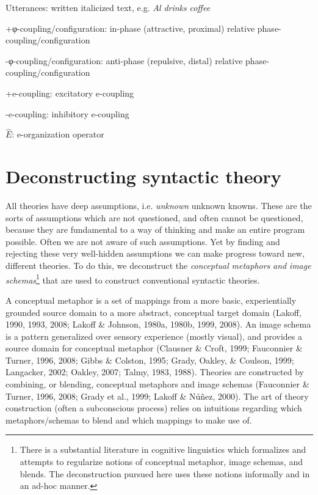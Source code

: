 Utterances: written italicized text, e.g. \textit{Al} \textit{drinks} \textit{coffee}

+φ-coupling/configuration: in-phase (attractive, proximal) relative phase-coupling/configuration

{}-φ-coupling/configuration: anti-phase (repulsive, distal) relative phase-coupling/configuration

+e-coupling: excitatory e-coupling

{}-e-coupling: inhibitory e-coupling

 $\widehat {{E}}$: e-organization operator

\chapter{Deconstructing syntactic theory}

All theories have deep assumptions, i.e. \textit{unknown} unknown knowns. These are the sorts of assumptions which are not questioned, and often cannot be questioned, because they are fundamental to a way of thinking and make an entire program possible. Often we are not aware of such assumptions. Yet by finding and rejecting these very well-hidden assumptions we can make progress toward new, different theories. To do this, we deconstruct the \textit{conceptual} \textit{metaphors} \textit{and} \textit{image} \textit{schemas}\footnote{There is a substantial literature in cognitive linguistics which formalizes and attempts to regularize notions of conceptual metaphor, image schemas, and blends. The deconstruction pursued here uses these notions informally and in an ad-hoc manner.} that are used to construct conventional syntactic theories. 

  A conceptual metaphor is a set of mappings from a more basic, experientially grounded source domain to a more abstract, conceptual target domain (Lakoff, 1990, 1993, 2008; Lakoff \& Johnson, 1980a, 1980b, 1999, 2008). An image schema is a pattern generalized over sensory experience (mostly visual), and provides a source domain for conceptual metaphor (Clausner \& Croft, 1999; Fauconnier \& Turner, 1996, 2008; Gibbs \& Colston, 1995; Grady, Oakley, \& Coulson, 1999; Langacker, 2002; Oakley, 2007; Talmy, 1983, 1988). Theories are constructed by combining, or blending, conceptual metaphors and image schemas (Fauconnier \& Turner, 1996, 2008; Grady et al., 1999; Lakoff \& Núñez, 2000). The art of theory construction (often a subconscious process) relies on intuitions regarding which metaphors/schemas to blend and which mappings to make use of.

